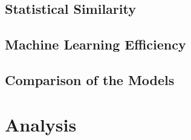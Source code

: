 \subsection{Statistical Similarity}
\label{ch:results-experimentalResults-statisticalSimilarity}

\subsection{Machine Learning Efficiency}
\label{ch:results-experimentalResults-machineLearningEfficiency}

\subsection{Comparison of the Models}
\label{ch:results-experimentalResults-comparisonOfTheModels}
\section{Analysis}
\label{ch:results-analysis}


